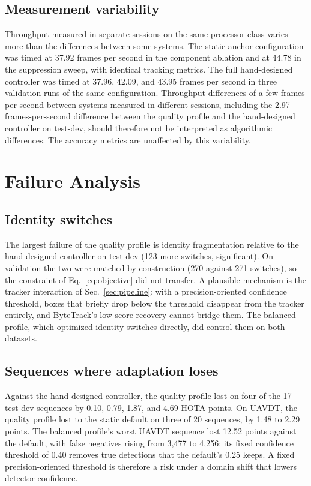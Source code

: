 \documentclass[journal]{new-aiaa}
\begin{document}
\subsection{Measurement variability}
Throughput measured in separate sessions on the same processor class varies more than the differences between some systems. The static anchor configuration was timed at 37.92 frames per second in the component ablation and at 44.78 in the suppression sweep, with identical tracking metrics. The full hand-designed controller was timed at 37.96, 42.09, and 43.95 frames per second in three validation runs of the same configuration. Throughput differences of a few frames per second between systems measured in different sessions, including the 2.97 frames-per-second difference between the quality profile and the hand-designed controller on test-dev, should therefore not be interpreted as algorithmic differences. The accuracy metrics are unaffected by this variability.

\section{Failure Analysis}\label{sec:failure}

\subsection{Identity switches}
The largest failure of the quality profile is identity fragmentation relative to the hand-designed controller on test-dev (123 more switches, significant). On validation the two were matched by construction (270 against 271 switches), so the constraint of Eq.~\eqref{eq:objective} did not transfer. A plausible mechanism is the tracker interaction of Sec.~\ref{sec:pipeline}: with a precision-oriented confidence threshold, boxes that briefly drop below the threshold disappear from the tracker entirely, and ByteTrack's low-score recovery cannot bridge them. The balanced profile, which optimized identity switches directly, did control them on both datasets.

\subsection{Sequences where adaptation loses}
Against the hand-designed controller, the quality profile lost on four of the 17 test-dev sequences by 0.10, 0.79, 1.87, and 4.69 HOTA points. On UAVDT, the quality profile lost to the static default on three of 20 sequences, by 1.48 to 2.29 points. The balanced profile's worst UAVDT sequence lost 12.52 points against the default, with false negatives rising from 3,477 to 4,256: its fixed confidence threshold of 0.40 removes true detections that the default's 0.25 keeps. A fixed precision-oriented threshold is therefore a risk under a domain shift that lowers detector confidence.
\end{document}
